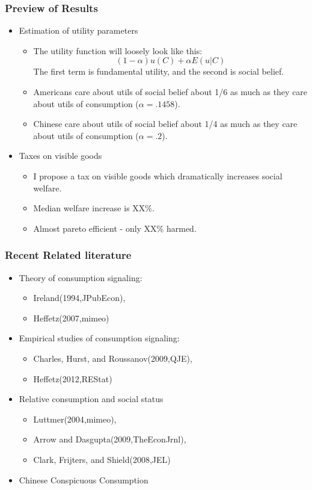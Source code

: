 \documentclass{beamer}
\begin{document}
\begin{frame}
  \frametitle{Preview of Results}
  	\begin{itemize}
           \item Estimation of utility parameters  
	     \begin{itemize}
	       \item The utility function will loosely look like this:
		 \[ 
		   (1-\alpha) u(C) + \alpha E(u|C)
		 \]
	         The first term is fundamental utility, and the second is social belief.
	       \item Americans care about utils of social belief about 1/6 as much as they care about utils of consumption ($\alpha = .1458$).
	       \item Chinese care about utils of social belief about 1/4 as much as they care about utils of consumption ($\alpha = .2$).
	     \end{itemize}
	   \item Taxes on visible goods
	     \begin{itemize}
		\item I propose a tax on visible goods which dramatically increases social welfare.
		\item Median welfare increase is XX\%.
		\item Almost pareto efficient - only XX\% harmed.
	     \end{itemize}
	\end{itemize}
\end{frame}
%
\begin{frame}
  \frametitle{Recent Related literature}
  	\begin{itemize}
           \item Theory of consumption signaling:  
	     \begin{itemize}
	       \item Ireland(1994,JPubEcon),	     
	       \item Heffetz(2007,mimeo)
	     \end{itemize}
	   \item Empirical studies of consumption signaling: 
	     \begin{itemize}
		\item Charles, Hurst, and Roussanov(2009,QJE),
		\item  Heffetz(2012,REStat) 
	     \end{itemize}
	   \item Relative consumption and social status
	     \begin{itemize}
		\item Luttmer(2004,mimeo),
		\item  Arrow and Dasgupta(2009,TheEconJrnl), 
		\item  Clark, Frijters, and Shield(2008,JEL)
	     \end{itemize}
	   \item Chinese Conspicuous Consumption
	     
	\end{itemize}
\end{frame}
%
\end{document}
